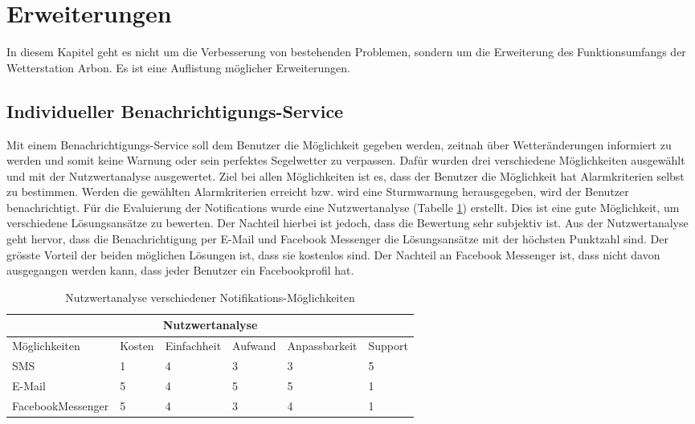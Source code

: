 \section{Erweiterungen}
In diesem Kapitel geht es nicht um die Verbesserung von bestehenden Problemen, sondern um die Erweiterung des Funktionsumfangs der Wetterstation Arbon. Es ist eine Auflistung möglicher Erweiterungen.

\subsection{Individueller Benachrichtigungs-Service}
Mit einem Benachrichtigungs-Service soll dem Benutzer die Möglichkeit gegeben werden, zeitnah über Wetteränderungen informiert zu werden und somit keine Warnung oder sein perfektes Segelwetter zu verpassen. Dafür wurden drei verschiedene Möglichkeiten ausgewählt und mit der Nutzwertanalyse ausgewertet. Ziel bei allen Möglichkeiten ist es, dass der Benutzer die Möglichkeit hat Alarmkriterien selbst zu bestimmen. Werden die gewählten Alarmkriterien erreicht bzw. wird eine Sturmwarnung herausgegeben, wird der Benutzer benachrichtigt. Für die Evaluierung der Notifications wurde eine Nutzwertanalyse (Tabelle \ref{table:nutzwertanalyse}) erstellt. Dies ist eine gute Möglichkeit, um verschiedene Lösungsansätze zu bewerten. Der Nachteil hierbei ist jedoch, dass die Bewertung sehr subjektiv ist. Aus der Nutzwertanalyse geht hervor, dass die Benachrichtigung per E-Mail und Facebook Messenger die Lösungsansätze mit der höchsten Punktzahl sind. Der grösste Vorteil der beiden möglichen Lösungen ist, dass sie kostenlos sind. Der Nachteil an Facebook Messenger ist, dass nicht davon ausgegangen werden kann, dass jeder Benutzer ein Facebookprofil hat. 

\begin{table}
\begin{center}
\begin{tabular}{ |p{3.5cm}||p{1.1cm}|p{2cm}|p{1.7cm}|p{2.3cm}|p{1.4cm}|}
 \hline
 \multicolumn{6}{|c|}{Nutzwertanalyse} \\
 \hline
	Möglichkeiten & Kosten & Einfachheit & Aufwand & Anpassbarkeit & Support\\
 \hline
	SMS & 1 & 4 & 3 & 3 & 5\\
	E-Mail & 5 & 4 & 5 & 5 & 1\\
	FacebookMessenger & 5 & 4 & 3 & 4 & 1\\
 
\hline
\end{tabular}
\end{center}
\caption{Nutzwertanalyse verschiedener Notifikations-Möglichkeiten}
\label{table:nutzwertanalyse}
\end{table}


